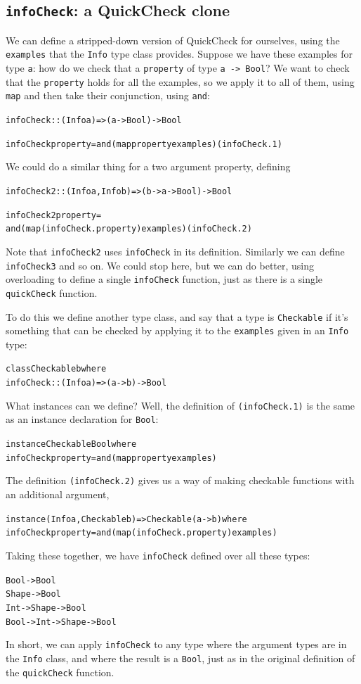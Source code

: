 \subsection*{\texttt{infoCheck}: a QuickCheck clone}
\label{infoCheck}

We can define a stripped-down version of QuickCheck for ourselves, using the \texttt{examples} that the \texttt{Info} type class provides. Suppose we have these examples for type \texttt{a}: how do we check that a \texttt{property} of type \texttt{a -> Bool}? We want to check that the \texttt{property} holds for all the examples, so we apply it to all of them, using \texttt{map} and then take their conjunction, using \texttt{and}:
\begin{alltt}
infoCheck :: (Info a) => (a -> Bool) -> Bool

infoCheck property = and (map property examples)\hfill(infoCheck.1)  
\end{alltt}
We could do a similar thing for a two argument property, defining
\begin{alltt}
infoCheck2 :: (Info a, Info b) => (b -> a -> Bool) -> Bool

infoCheck2 property = 
    and (map (infoCheck.property) examples) \hfill(infoCheck.2)  
\end{alltt}
Note that \texttt{infoCheck2} uses \texttt{infoCheck} in its definition. Similarly we can define \texttt{infoCheck3} and so on. We could stop here, but we can do better, using overloading to define a single \texttt{infoCheck} function, just as there is a single \texttt{quickCheck} function.

To do this we define another type class, and say that a type is \texttt{Checkable} if it's something that can be checked by applying it to the \texttt{examples} given in an \texttt{Info} type:
\begin{alltt}
class Checkable b where
 infoCheck :: (Info a) => (a -> b) -> Bool
\end{alltt}
What instances can we define? Well, the definition of \texttt{(infoCheck.1)} is the same as an instance declaration for \texttt{Bool}:
\begin{alltt}
instance Checkable Bool where
  infoCheck property = and (map property examples)  
\end{alltt}
The definition \texttt{(infoCheck.2)} gives us a way of making checkable functions with an additional argument,
\begin{alltt}
instance (Info a, Checkable b) => Checkable (a -> b) where
  infoCheck property = and (map (infoCheck.property) examples) 
\end{alltt}
Taking these together, we have \texttt{infoCheck} defined over all these types:
\begin{alltt}
Bool -> Bool
Shape -> Bool
Int -> Shape -> Bool
Bool -> Int -> Shape -> Bool
\end{alltt}
In short, we can apply \texttt{infoCheck} to any type where the argument types are in the \texttt{Info} class, and where the result is a \texttt{Bool}, just as in the original definition of the \texttt{quickCheck} function.


